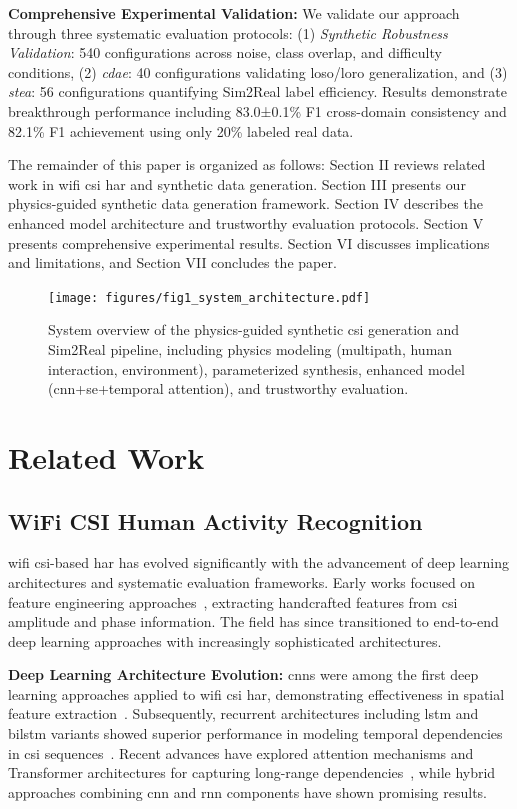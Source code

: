 \documentclass[journal]{IEEEtran}
\begin{document}
\textbf{Comprehensive Experimental Validation:} We validate our approach through three systematic evaluation protocols: (1) \textit{Synthetic Robustness Validation}: 540 configurations across noise, class overlap, and difficulty conditions, (2) \textit{\gls{cdae}}: 40 configurations validating \gls{loso}/\gls{loro} generalization, and (3) \textit{\gls{stea}}: 56 configurations quantifying Sim2Real label efficiency. Results demonstrate breakthrough performance including 83.0±0.1\% F1 cross-domain consistency and 82.1\% F1 achievement using only 20\% labeled real data.

The remainder of this paper is organized as follows: Section II reviews related work in \gls{wifi} \gls{csi} \gls{har} and synthetic data generation. Section III presents our physics-guided synthetic data generation framework. Section IV describes the enhanced model architecture and trustworthy evaluation protocols. Section V presents comprehensive experimental results. Section VI discusses implications and limitations, and Section VII concludes the paper.

\begin{figure}[t]
\centering
\texttt{[image: figures/fig1\_system\_architecture.pdf]}
\caption{System overview of the physics-guided synthetic \gls{csi} generation and Sim2Real pipeline, including physics modeling (multipath, human interaction, environment), parameterized synthesis, enhanced model (\gls{cnn}+\gls{se}+temporal attention), and trustworthy evaluation.}
\label{fig:system_overview}
\end{figure}


\section{Related Work}

\subsection{WiFi CSI Human Activity Recognition}

\gls{wifi} \gls{csi}-based \gls{har} has evolved significantly with the advancement of deep learning architectures and systematic evaluation frameworks. Early works focused on feature engineering approaches~\cite{csi_basics2016}, extracting handcrafted features from \gls{csi} amplitude and phase information. The field has since transitioned to end-to-end deep learning approaches with increasingly sophisticated architectures.

\textbf{Deep Learning Architecture Evolution:} \glspl{cnn} were among the first deep learning approaches applied to \gls{wifi} \gls{csi} \gls{har}, demonstrating effectiveness in spatial feature extraction~\cite{clnet2021}. Subsequently, recurrent architectures including \gls{lstm} and \gls{bilstm} variants showed superior performance in modeling temporal dependencies in \gls{csi} sequences~\cite{rewis2022}. Recent advances have explored attention mechanisms and Transformer architectures for capturing long-range dependencies~\cite{autofi2022}, while hybrid approaches combining \gls{cnn} and \gls{rnn} components have shown promising results.
\end{document}
